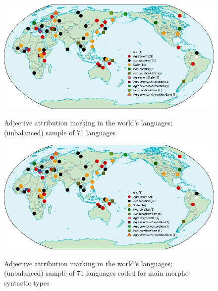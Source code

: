 
\newpage
\begin{figure}
    
        \caption[Adjective attribution marking, World]{Adjective attribution marking in the world's languages; (unbalanced) sample of 71 languages}

\includegraphics[width=\textwidth]{figures/WorldMapTyp.jpg}%
\label{WorldMap}
\end{figure}

\newpage
\begin{figure}
    
        \caption[Adjective attribution marking, World, main types]{Adjective attribution marking in the world's languages; (unbalanced) sample of 71 languages coded for main morpho-syntactic types}

\includegraphics[width=\textwidth]{figures/WorldMapTyp.jpg}%
\label{WorldMapTyp}
\end{figure}

